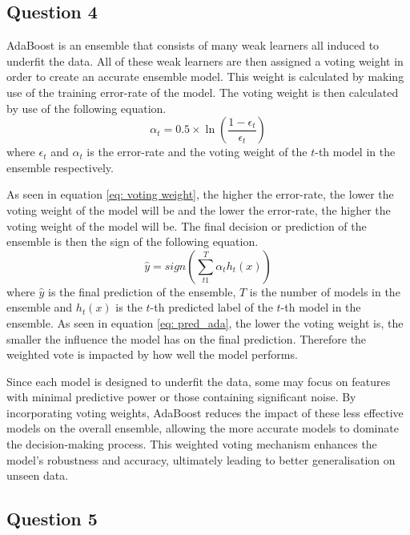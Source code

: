 \documentclass[10pt]{article}
\begin{document}
\subsection*{Question 4}

AdaBoost is an ensemble that consists of many weak learners all induced to underfit the data. All of these weak learners
are then assigned a voting weight in order to create an accurate ensemble model. This weight is calculated by making
use of the training error-rate of the model. The voting weight is then calculated by use of
the following equation.
\begin{equation}
    \alpha_t = 0.5 \times \ln \left( \frac{1 - \epsilon_t}{\epsilon_t} \right) \label{eq: voting weight}
\end{equation}
where $\epsilon_t$ and $\alpha_t$ is the error-rate and the voting weight of the $t$-th model in the ensemble
respectively.

As seen in equation \ref{eq: voting weight}, the higher the error-rate, the lower the voting weight of the model will be
and the lower the error-rate, the higher the voting weight of the model will be. The final decision or prediction of the
ensemble is then the sign of the following equation.
\begin{equation}
    \hat{y} = sign \left( \sum_{t1}^{T} \alpha_t h_t(x)\right) \label{eq: pred_ada}
\end{equation}
where $\hat{y}$ is the final prediction of the ensemble, $T$ is the number of models in the ensemble and $h_t(x)$
is the $t$-th predicted label of the $t$-th model in the ensemble. As seen in equation \ref{eq: pred_ada}, the
lower the voting weight is, the smaller the influence the model has on the final prediction. Therefore the weighted
vote is impacted by how well the model performs.

Since each model is designed to underfit the data, some may focus on features with minimal predictive power or those
containing significant noise. By incorporating voting weights, AdaBoost reduces the impact of these less effective
models on the overall ensemble, allowing the more accurate models to dominate the decision-making process. This
weighted voting mechanism enhances the model's robustness and accuracy, ultimately leading to better generalisation
on unseen data.

\subsection*{Question 5}
\end{document}
